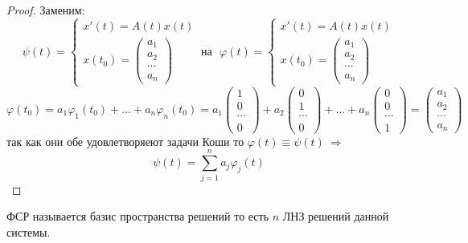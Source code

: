 \begin{proof}
  Заменим:
  $$
  \psi(t) =
  \left\{
  \begin{array}{l}
  x'(t) = A(t)x(t)\\
  x(t_0) =
  \left(
  \begin{array}{c}
    a_1 \\
    a_2 \\
    \cdots \\
    a_n
  \end{array}
  \right)
  \end{array}
  \right. ~ \text{на} ~~~ \varphi(t) =
  \left\{
  \begin{array}{c}
  x'(t) = A(t)x(t)\\
  x(t_0) =
  \left(
  \begin{array}{c}
    a_1 \\
    a_2 \\
    \cdots \\
    a_n
  \end{array}
  \right)
  \end{array}
  \right.
  $$
  $$
  \varphi(t_0) = a_1 \varphi_1(t_0) + \ldots + a_n \varphi_n(t_0) =
  a_1
  \left(
  \begin{array}{c}
    1 \\
    0 \\
    \cdots \\
    0
  \end{array}
  \right) +
  a_2
  \left(
  \begin{array}{c}
    0 \\
    1 \\
    \cdots \\
    0
  \end{array}
  \right) + \ldots +
  a_n
  \left(
  \begin{array}{c}
    0 \\
    0 \\
    \cdots \\
    1
  \end{array}
  \right) =
  \left(
  \begin{array}{c}
    a_1 \\
    a_2 \\
    \cdots \\
    a_n
  \end{array}
  \right)
  $$
  так как они обе удовлетворяеют задачи Коши то $\varphi(t) \equiv \psi(t) ~
  \Rightarrow$
  $$
  \psi(t) = \sum_{j=1}^n a_j \varphi_j(t)
  $$
\end{proof}

\begin{define}
  ФСР называется базис пространства решений то есть $n$ ЛНЗ решений данной
  системы.
\end{define}


